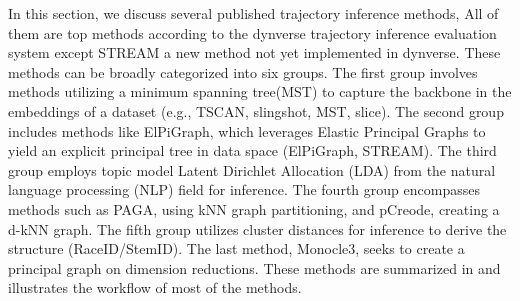 In this section, we discuss several published trajectory inference methods, All of them are top methods according to the dynverse trajectory inference evaluation system\citep{saelens2019comparison} except STREAM a new method not yet implemented in dynverse. These methods can be broadly categorized into six groups. The first group involves methods utilizing a minimum spanning tree(MST) to capture the backbone in the embeddings of a dataset (e.g., TSCAN, slingshot, MST, slice). The second group includes methods like ElPiGraph, which leverages Elastic Principal Graphs to yield an explicit principal tree in data space (ElPiGraph, STREAM). The third group employs topic model Latent Dirichlet Allocation (LDA) from the natural language processing (NLP) field for inference. The fourth group encompasses methods such as PAGA, using kNN graph partitioning, and pCreode, creating a d-kNN graph. The fifth group utilizes cluster distances for inference to derive the structure (RaceID/StemID). The last method, Monocle3, seeks to create a principal graph on dimension reductions. These methods are summarized in  and  illustrates the workflow of most of the methods.

